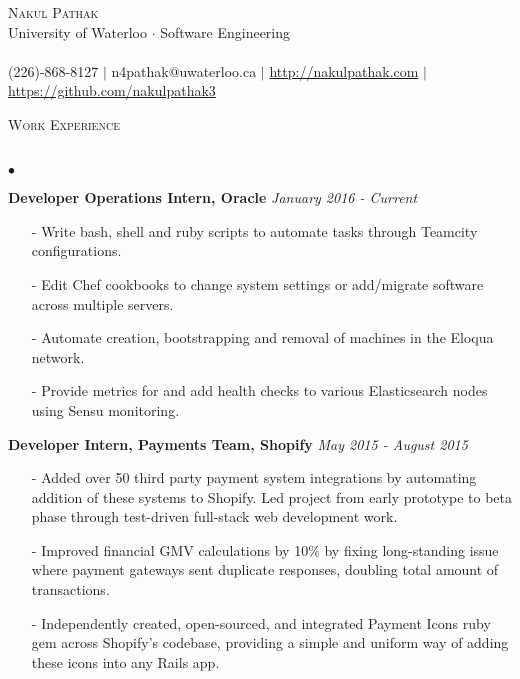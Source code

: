 \documentclass[10pt]{article}
\newcommand{\lineunder}{\vspace*{-8pt} \\ \hspace*{-18pt} \hrulefill \\}
\newcommand{\header}[1]{{\hspace*{-15pt}\vspace*{6pt} \textsc{#1}} \vspace*{-6pt} \lineunder }
\newenvironment{achievements}{\begin{list}{$\bullet$}{\topsep 0pt \itemsep -1.5pt \leftmargin 5pt}}{\vspace*{4pt}\end{list}}
\begin{document}
\small
\smallskip
\vspace*{-45pt}

\begin{center}
  {\Huge \scshape {Nakul Pathak}} \\
  \vspace*{6pt} 
{\fontsize{10}{1}\selectfont University of Waterloo $\cdot$ Software Engineering} \\
\vspace{-4pt}
\hspace*{-18pt} \hrulefill \\
\vspace{2pt}
\hspace*{-18pt} (226)-868-8127 $|$ n4pathak@uwaterloo.ca $|$ \url{http://nakulpathak.com} $|$  \url{https://github.com/nakulpathak3}
\vspace{-5pt}
\end{center}


\vspace{10pt}

\header{\fontsize{11}{12}\selectfont  Work Experience}
\begin{achievements}
\item \textbf{Developer Operations Intern, Oracle} \hfill \textit {January 2016 - Current}
\begin{itemize}
\item[-]Write bash, shell and ruby scripts to automate tasks through Teamcity configurations.
\vspace{2pt}
\item[-]Edit Chef cookbooks to change system settings or add/migrate software across multiple servers.
\vspace{2pt}
\item[-]Automate creation, bootstrapping and removal of machines in the Eloqua network.
\vspace{2pt}
\item[-]Provide metrics for and add health checks to various Elasticsearch nodes using Sensu monitoring.
\end{itemize}
\vspace{5pt}
\item \textbf{Developer Intern, Payments Team, Shopify} \hfill \textit {May 2015 - August 2015}
\begin{itemize}
\item[-]Added over 50 third party payment system integrations by automating addition of these systems to Shopify. Led project from early prototype to beta phase through test-driven full-stack web development work.
\vspace{2pt}
\item[-]Improved financial GMV calculations by 10\% by fixing long-standing issue where payment gateways sent duplicate responses, doubling total amount of transactions. 
\vspace{2pt}
\item[-]Independently created, open-sourced, and integrated Payment Icons ruby gem across Shopify's codebase, providing a simple and uniform way of adding these icons into any Rails app.
\end{itemize}
\end{achievements}
\end{document}

